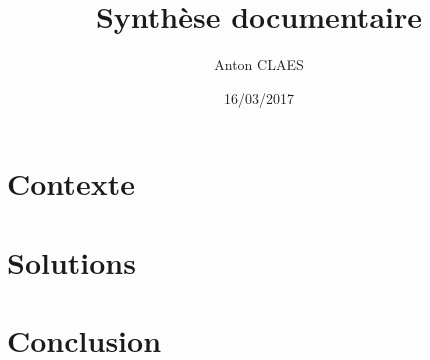 \documentclass{article}
\title{Synthèse documentaire}
\author{Anton CLAES}
\date{16/03/2017}
\begin{document}
\maketitle
\tableofcontents

\section{Contexte}

\section{Solutions}

\section{Conclusion}
\end{document}
